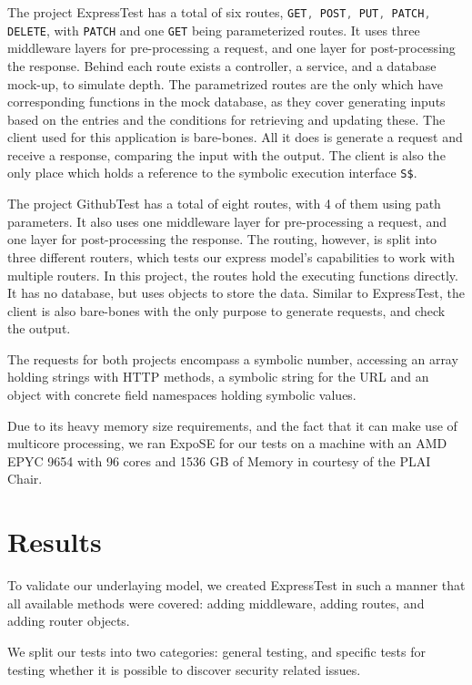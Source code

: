 The project ExpressTest has a total of six routes, \lstinline[language=JavaScript]+GET, POST, PUT, PATCH, DELETE+,
with \lstinline[language=JavaScript]+PATCH+ and one \lstinline[language=JavaScript]+GET+ 
being parameterized routes. It uses three middleware layers for pre-processing a request, and one layer for post-processing the response. Behind each route exists a controller, a service, and a database mock-up, to simulate depth. The parametrized routes are the only which have corresponding functions in the mock database, as they cover generating inputs based on the entries and the conditions for retrieving and updating these. The client used for this application is bare-bones. All it does is generate a request and receive a response, comparing the input with the output. The client is also the only place which holds a reference to the symbolic execution interface 
\lstinline[language=JavaScript]{S$}. 

The project GithubTest has a total of eight routes, with 4 of them using path parameters.
It also uses one middleware layer for pre-processing a request, and one layer for post-processing the response. The routing, however, is split into three different routers, which tests our express model's capabilities to work with multiple routers. In this project, the routes hold the executing functions directly. It has no database, but uses objects to store the data. Similar to ExpressTest, the client is also bare-bones with the only purpose to generate requests, and check the output. 

The requests for both projects encompass a symbolic number, accessing an array holding strings with HTTP methods, a symbolic string for the URL and an object with concrete field namespaces holding symbolic values.


Due to its heavy memory size requirements, and the fact that it can make use of multicore processing, we ran ExpoSE for our tests on a machine with an AMD EPYC 9654 with 96 cores and 1536 GB of Memory in courtesy of the PLAI Chair.


\section{Results}
\label{sec:results}

To validate our underlaying model, we created ExpressTest in such a manner that all available methods were covered: adding middleware, adding routes, and adding router objects.

We split our tests into two categories: general testing, and specific tests for testing whether it is possible to discover security related issues.



